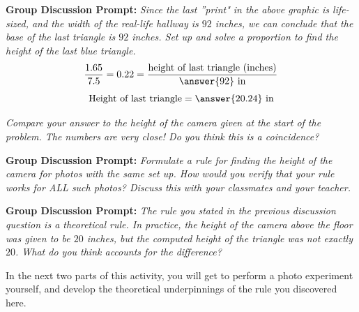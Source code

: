 \documentclass{ximera}
\begin{document}
\begin{exploration}
\textbf{Group Discussion Prompt:}
    \emph{Since the last ''print" in the above graphic is life-sized, and the width of the real-life hallway is $92$ inches, we can conclude that the base of the last triangle is $92$ inches. 
    Set up and solve a proportion to find the height of the last blue triangle.}  
    $$\frac{1.65}{7.5}=0.22=\frac{\text{height of last triangle (inches)}}{\answer{92}~\text{in}}$$
    $$\text{Height of last triangle}=\answer{20.24}~\text{in}$$

   \emph{Compare your answer to the height of the camera given at the start of the problem.  The numbers are very close!  Do you think this is a coincidence?}  

\textbf{Group Discussion Prompt:}
    \emph{Formulate a rule for finding the height of the camera for photos with the same set up.  How would you verify that your rule works for ALL such photos?  Discuss this with your classmates and your teacher.}
    
\textbf{Group Discussion Prompt:}
    \emph{The rule you stated in the previous discussion question is a theoretical rule.  In practice, the height of the camera above the floor was given to be $20$ inches, but the computed height of the triangle was not exactly $20$.  What do you think accounts for the difference?}  
\end{exploration}

In the next two parts of this activity, you will get to perform a photo experiment yourself, and develop the theoretical underpinnings of the rule you discovered here.
\end{document}
